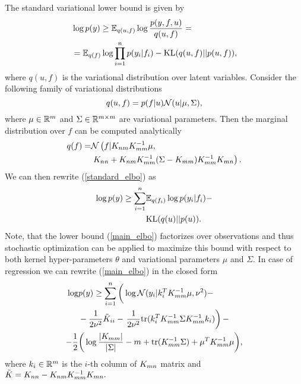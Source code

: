   The standard variational lower bound is given by
  \begin{equation}
  \label{standard_elbo}
  \begin{split}
    &\log p(y) \ge \mathbb{E}_{q(u, f)} \log \frac {p(y, f, u)} {q(u, f)} =\\
    & = \mathbb{E}_{q(f)} \log \prod_{i=1}^n p(y_i | f_i) - \mbox{KL}(q(u, f) || p(u, f)),
  \end{split}
  \end{equation}
  where $q(u, f)$ is the variational distribution over latent variables.
  Consider the following family of variational distributions
  \begin{equation}
  \label{var_family}
    q(u, f) = p(f | u) \mathcal{N}(u | \mu, \Sigma),
  \end{equation}
  where $\mu \in \mathbb{R}^m$ and $\Sigma \in \mathbb{R}^{m \times m}$ are variational
  parameters. Then the marginal distribution over $f$ can be computed analytically
  \begin{equation}
  \begin{split}
    q(f)  = &\mathcal{N}\left(f | K_{nm} K_{mm}^{-1} \mu,\right.\\
    &\left.K_{nn} + K_{nm} K_{mm}^{-1} (\Sigma - K_{mm}) K_{mm}^{-1} K_{mn}\right).
  \end{split}
  \end{equation}
  We can then rewrite (\ref{standard_elbo}) as
  \begin{equation}
  \label{main_elbo}
  \begin{split}
    \log p(y) \ge \sum_{i=1}^n & \mathbb{E}_{q(f_i)} \log p(y_i | f_i) - \\
      & \mbox{KL}(q(u) || p(u)).
  \end{split}
  \end{equation}
  Note, that the lower bound (\ref{main_elbo}) factorizes over observations and
  thus stochastic optimization can be applied to maximize this bound with respect
  to both kernel hyper-parameters $\theta$ and variational parameters $\mu$ and
  $\Sigma$. In case of regression we can rewrite (\ref{main_elbo}) in the closed
  form
  \begin{equation}
    \label{elbo_reg}
    \begin{split}
      \log & p(y) \ge 
      \sum_{i=1}^n  \bigg (\log \mathcal{N} (y_i | k_{i}^T K_{mm}^{-1} \mu, \nu^2) - \\
        &- \frac 1 {2\nu^2} \tilde K_{ii} - 
        \left . \frac 1 {2\nu^2} \mbox{tr} (k_{i}^T K_{mm}^{-1} \Sigma K_{mm}^{-1} k_{i})
      \right )-
      \\
      - \frac 1 2 & \bigg(
      \log \frac {|K_{mm}|} {|\Sigma|}  - m + \mbox{tr}(K_{mm}^{-1} \Sigma) +
        \mu^T K_{mm}^{-1} \mu 
      \bigg),
    \end{split}
  \end{equation}
  where $k_{i} \in \mathbb{R}^m$ is the $i$-th column of $K_{mn}$ matrix and $\tilde{K} = K_{nn} - K_{nm} K_{mm}^{-1} K_{mn}.$
  

